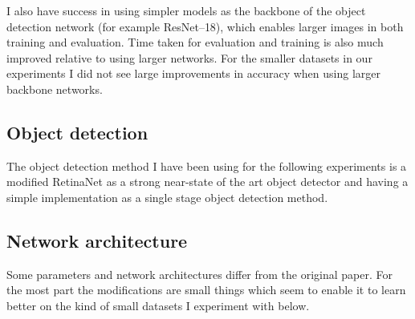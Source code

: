 I also have success in using simpler models as the backbone of the object detection network (for example ResNet--18), which enables larger images in both training and evaluation. Time taken for evaluation and training is also much improved relative to using larger networks. For the smaller datasets in our experiments I did not see large improvements in accuracy when using larger backbone networks.








\subsection {Object detection}

The object detection method I have been using for the following experiments is a modified RetinaNet \cite{Lin2017} as a strong near-state of the art object detector and having a simple implementation as a single stage object detection method. 






\subsection {Network architecture}
\label{sec:architecture}


Some parameters and network architectures differ from the original paper. For the most part the modifications are small things which seem to enable it to learn better on the kind of small datasets I experiment with below. 


